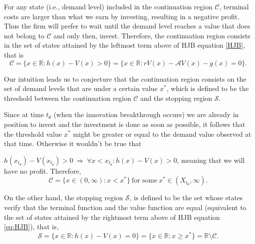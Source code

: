 For any state (i.e., demand level) included in the continuation region $\mathcal{C}$, terminal costs are larger than what we earn by investing, resulting in a negative profit. Thus the firm will prefer to wait until the demand level reaches a value that does not belong to $\mathcal{C}$ and only then, invest. Therefore, the continuation region consists in the set of states attained by the leftmost term above of HJB equation \eqref{HJB}, that is
\begin{equation*}
\mathcal{C}=\{ x \in \mathds{R}: h(x)-V(x)>0 \}=\{ x \in \mathds{R}: rV(x)- \mathcal{A}V(x)-g(x)=0 \}.
\label{cont}
\end{equation*}

Our intuition leads us to conjecture that the continuation region consists on the set of demand levels that are under a certain value $x^*$, which is defined to be the threshold between the continuation region $\mathcal{C}$ and the stopping region $\mathcal{S}$.


Since at time $t_\theta$ (when the innovation breakthrough occurs) we are already in position to invest and the investment is done as soon as possible, it follows that the threshold value $x^*$ might be greater or equal to the demand value observed at that time. Otherwise it wouldn't be true that


$h(x_{t_\theta})-V(x_{t_\theta})>0\ \Rightarrow \ \forall x<x_{t_\theta}: h(x)-V(x)>0$, meaning that we will have no profit. Therefore,
\begin{equation}
	\mathcal{C} = \{ x \in (0, \infty): x<x^* \} \ \text{for some} \ x^* \in 
	(X_{t_\theta}, \infty).
	\label{c_region}
\end{equation}

On the other hand, the stopping region $\mathcal{S}$, is defined to be the set whose states verify that the terminal function and the value function are equal (equivalent to the set of states attained by the rightmost term above of HJB equation \eqref{eq:HJB}), that is,
\begin{equation}
\mathcal{S}=\{ x \in \mathds{R}: h(x)-V(x)=0 \}= \{ x \in \mathds{R}: x\geq x^* \}= \mathds{R} \setminus \mathcal{C}.
\label{s_region}
\end{equation}

